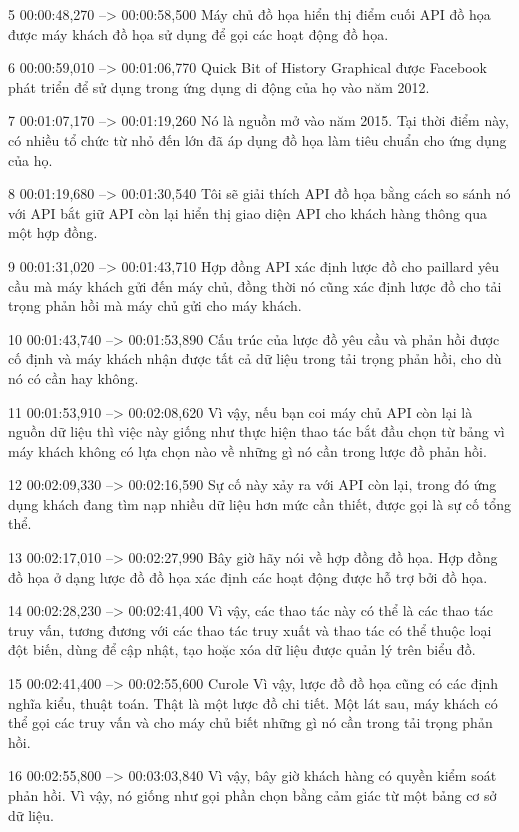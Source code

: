 5
00:00:48,270 --> 00:00:58,500
Máy chủ đồ họa hiển thị điểm cuối API đồ họa được máy khách đồ họa sử dụng để gọi các hoạt động đồ họa.

6
00:00:59,010 --> 00:01:06,770
Quick Bit of History Graphical được Facebook phát triển để sử dụng trong ứng dụng di động của họ vào năm 2012.

7
00:01:07,170 --> 00:01:19,260
Nó là nguồn mở vào năm 2015. Tại thời điểm này, có nhiều tổ chức từ nhỏ đến lớn đã áp dụng đồ họa làm tiêu chuẩn cho ứng dụng của họ.

8
00:01:19,680 --> 00:01:30,540
Tôi sẽ giải thích API đồ họa bằng cách so sánh nó với API bắt giữ API còn lại hiển thị giao diện API cho khách hàng thông qua một hợp đồng.

9
00:01:31,020 --> 00:01:43,710
Hợp đồng API xác định lược đồ cho paillard yêu cầu mà máy khách gửi đến máy chủ, đồng thời nó cũng xác định lược đồ cho tải trọng phản hồi mà máy chủ gửi cho máy khách.

10
00:01:43,740 --> 00:01:53,890
Cấu trúc của lược đồ yêu cầu và phản hồi được cố định và máy khách nhận được tất cả dữ liệu trong tải trọng phản hồi, cho dù nó có cần hay không.

11
00:01:53,910 --> 00:02:08,620
Vì vậy, nếu bạn coi máy chủ API còn lại là nguồn dữ liệu thì việc này giống như thực hiện thao tác bắt đầu chọn từ bảng vì máy khách không có lựa chọn nào về những gì nó cần trong lược đồ phản hồi.

12
00:02:09,330 --> 00:02:16,590
Sự cố này xảy ra với API còn lại, trong đó ứng dụng khách đang tìm nạp nhiều dữ liệu hơn mức cần thiết, được gọi là sự cố tổng thể.

13
00:02:17,010 --> 00:02:27,990
Bây giờ hãy nói về hợp đồng đồ họa.  Hợp đồng đồ họa ở dạng lược đồ đồ họa xác định các hoạt động được hỗ trợ bởi đồ họa.

14
00:02:28,230 --> 00:02:41,400
Vì vậy, các thao tác này có thể là các thao tác truy vấn, tương đương với các thao tác truy xuất và thao tác có thể thuộc loại đột biến, dùng để cập nhật, tạo hoặc xóa dữ liệu được quản lý trên biểu đồ.

15
00:02:41,400 --> 00:02:55,600
Curole Vì vậy, lược đồ đồ họa cũng có các định nghĩa kiểu, thuật toán.  Thật là một lược đồ chi tiết.  Một lát sau, máy khách có thể gọi các truy vấn và cho máy chủ biết những gì nó cần trong tải trọng phản hồi.

16
00:02:55,800 --> 00:03:03,840
Vì vậy, bây giờ khách hàng có quyền kiểm soát phản hồi.  Vì vậy, nó giống như gọi phần chọn bằng cảm giác từ một bảng cơ sở dữ liệu.

